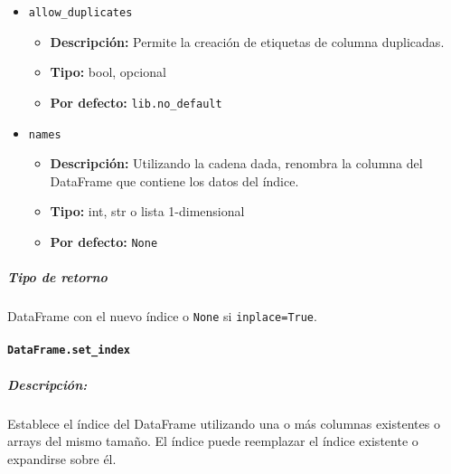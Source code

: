 \begin{itemize}
    \item \texttt{allow\_duplicates}
          \begin{itemize}
              \item \textbf{Descripción:} Permite la creación de etiquetas de
                    columna duplicadas.
              \item \textbf{Tipo:} bool, opcional
              \item \textbf{Por defecto:} \texttt{lib.no\_default}
          \end{itemize}

    \item \texttt{names}
          \begin{itemize}
              \item \textbf{Descripción:} Utilizando la cadena dada, renombra
                    la columna del DataFrame que contiene los datos del índice.
              \item \textbf{Tipo:} int, str o lista 1-dimensional
              \item \textbf{Por defecto:} \texttt{None}
          \end{itemize}
\end{itemize}

\subparagraph{Tipo de retorno}
DataFrame con el nuevo índice o \texttt{None} si \texttt{inplace=True}.

\paragraph{\texttt{DataFrame.set\_index}}

\subparagraph{Descripción:}
Establece el índice del DataFrame utilizando una o más columnas existentes o
arrays del mismo tamaño. El índice puede reemplazar el índice existente o
expandirse sobre él.

